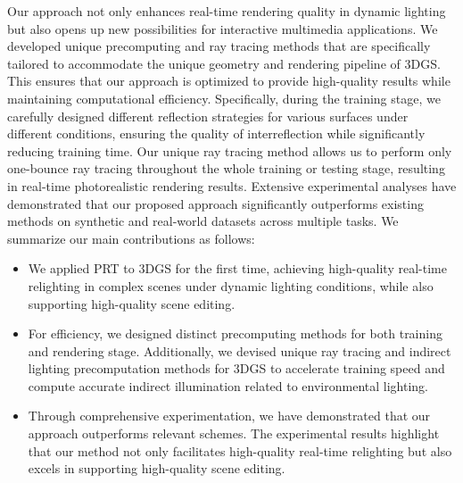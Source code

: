 Our approach not only enhances real-time rendering quality in dynamic lighting but also opens up new possibilities for interactive multimedia applications. We developed unique precomputing and ray tracing methods that are specifically tailored to accommodate the unique geometry and rendering pipeline of 3DGS. This ensures that our approach is optimized to provide high-quality results while maintaining computational efficiency. Specifically, during the training stage, we carefully designed different reflection strategies for various surfaces under different conditions, ensuring the quality of interreflection while significantly reducing training time. Our unique ray tracing method allows us to perform only one-bounce ray tracing throughout the whole training or testing stage, resulting in real-time photorealistic rendering results. Extensive experimental analyses have demonstrated that our proposed approach significantly outperforms existing methods on synthetic and real-world datasets across multiple tasks. We summarize our main contributions as follows:
\begin{itemize}
     \vspace{-0.4cm}
\item[$\bullet$]  We applied PRT to 3DGS for the first time, achieving high-quality real-time relighting in complex scenes under dynamic lighting conditions, while also supporting high-quality scene editing.


\item[$\bullet$] For efficiency, we designed distinct precomputing methods for both training and rendering stage. Additionally, we devised unique ray tracing and indirect lighting precomputation methods for 3DGS to accelerate training speed and compute accurate indirect illumination related to environmental lighting.
\item[$\bullet$] 
Through comprehensive experimentation, we have demonstrated that our approach outperforms relevant schemes. The experimental results highlight that our method not only facilitates high-quality real-time relighting but also excels in supporting high-quality scene editing.
\end{itemize}


